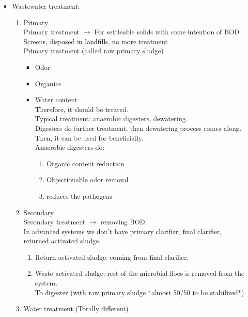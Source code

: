 \documentclass[12pt]{article}
\begin{document}
\begin{itemize}
    \item Wastewater treatment:\begin{enumerate}
        \item Primary\\
        Primary treatment $\rightarrow$ For settleable solids with some intention of BOD\\
        Screens, disposed in landfills, no more treatment\\
        Primary treatment (called raw primary sludge)\begin{itemize}
            \item Odor
            \item Organics
            \item Water content\\
            Therefore, it should be treated.\\
            Typical treatment: anaerobic digesters, dewatering.\\
            Digesters do further treatment, then dewatering process comes along.\\
            Then, it can be used for beneficially.\\
            Anaerobic digesters do:\begin{enumerate}
                \item Organic content reduction
                \item Objectionable odor removal
                \item reduces the pathogens
            \end{enumerate}
        \end{itemize}
        \item Secondary\\
        Secondary treatment $\rightarrow$ removing BOD\\
        In advanced systems we don't have primary clarifier, final clarifier, returned activated sludge.\begin{enumerate}
            \item Return activated sludge: coming from final clarifier.
            \item Waste activated sludge: rest of the microbial flocs is removed from the system.\\
            To digester (with raw primary sludge *almost 50/50 to be stabilized*)
        \end{enumerate}
    \item Water treatment (Totally different)\\

\end{enumerate}
\end{itemize}
\end{document}
